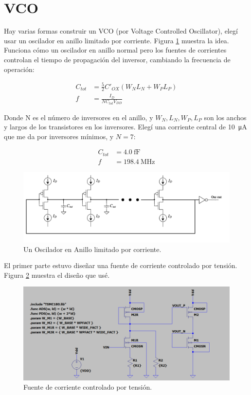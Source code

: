 \documentclass[a4paper]{article}
\begin{document}
\section{VCO}

Hay varias formas construir un VCO (por Voltage Controlled Oscillator), elegí usar un oscilador en anillo limitado por corriente. Figura \ref{fig:csro1} muestra la idea. Funciona cómo un oscilador en anillo normal pero los fuentes de corrientes controlan el tiempo de propagación del inversor, cambiando la frecuencia de operación:

\begin{align*}
C_{tot} &= \frac{5}{2} C\prime_{OX}(W_N L_N + W_P L_P) \\
f &= \frac{I_D}{N C_{tot} V_{DD}}
\end{align*}

Donde N es el número de inversores en el anillo, y $W_N, L_N, W_P, L_P$ son los anchos y largos de los transistores en los inversores. Elegí una corriente central de \SI{10}{\micro\ampere} que me da por inversores mínimos, y $N = 7$:

\begin{align*}
C_{tot} &= \SI{4.0}{\femto\farad} \\
f &= \SI{198.4}{\mega\hertz}
\end{align*}

\begin{figure}[!htb]
\centering
\includegraphics[scale=0.4]{./img/csro1}
\caption{Un Oscilador en Anillo limitado por corriente.}
\label{fig:csro1}
\end{figure}

El primer parte estuvo diseñar una fuente de corriente controlado por tensión. Figura \ref{fig:current_source_sch} muestra el diseño que usé.

\begin{figure}[!htb]
\centering
\includegraphics[scale=0.4]{./img/current_source_sch}
\caption{Fuente de corriente controlado por tensión.}
\label{fig:current_source_sch}
\end{figure}
\end{document}
